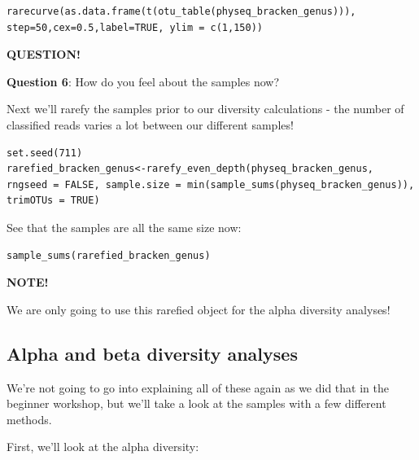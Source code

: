 \documentclass[
]{book}
\newenvironment{bluebox}{
  \definecolor{shadecolor}{RGB}{172, 210, 237}
  \color{white}
  \begin{shaded}}
 {\end{shaded}}
\newenvironment{greenbox}{
  \definecolor{shadecolor}{RGB}{141, 181, 128}
  \color{white}
  \begin{shaded}}
 {\end{shaded}}
\begin{document}
\begin{verbatim}
rarecurve(as.data.frame(t(otu_table(physeq_bracken_genus))), step=50,cex=0.5,label=TRUE, ylim = c(1,150))
\end{verbatim}

\begin{bluebox}

\begin{center}
\textbf{QUESTION!}

\end{center}

\textbf{Question 6}: How do you feel about the samples now?

\end{bluebox}

Next we'll rarefy the samples prior to our diversity calculations - the number of classified reads varies a lot between our different samples!

\begin{verbatim}
set.seed(711)
rarefied_bracken_genus<-rarefy_even_depth(physeq_bracken_genus, rngseed = FALSE, sample.size = min(sample_sums(physeq_bracken_genus)), trimOTUs = TRUE)
\end{verbatim}

See that the samples are all the same size now:

\begin{verbatim}
sample_sums(rarefied_bracken_genus)
\end{verbatim}

\begin{greenbox}

\begin{center}
\textbf{NOTE!}

\end{center}

We are only going to use this rarefied object for the alpha diversity analyses!

\end{greenbox}

\subsection{Alpha and beta diversity analyses}\label{alpha-and-beta-diversity-analyses}

We're not going to go into explaining all of these again as we did that in the beginner workshop, but we'll take a look at the samples with a few different methods.

First, we'll look at the alpha diversity:
\end{document}
